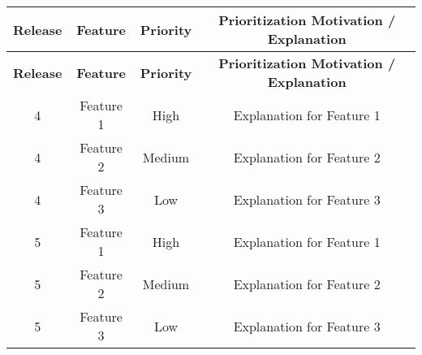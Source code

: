 \begin{longtable}{|c|c|c|c|}
    \hline
\rowcolor{headergray}
\textbf{Release} & \textbf{Feature} & \textbf{Priority} & \textbf{Prioritization Motivation / Explanation} \\
\hline
\endfirsthead
\rowcolor{headergray}
\hline
\textbf{Release} & \textbf{Feature} & \textbf{Priority} & \textbf{Prioritization Motivation / Explanation} \\
\hline
\endhead
\hline
\endfoot
\hline
\endlastfoot

4 & Feature 1 & High & Explanation for Feature 1 \\
4 & Feature 2 & Medium & Explanation for Feature 2 \\
4 & Feature 3 & Low & Explanation for Feature 3 \\
\hline
5 & Feature 1 & High & Explanation for Feature 1 \\
5 & Feature 2 & Medium & Explanation for Feature 2 \\
5 & Feature 3 & Low & Explanation for Feature 3 \\
\hline

\end{longtable}